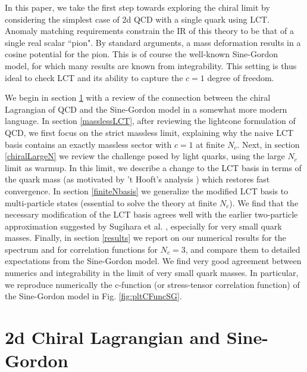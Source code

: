 \documentclass[12pt]{article}
\begin{document}
In this paper, we take the first step towards exploring the chiral limit by considering the simplest case of 2d QCD with a single quark using LCT.  Anomaly matching requirements constrain the IR of this theory to be that of a single real scalar ``pion".  By standard arguments, a mass deformation results in a cosine potential for the pion.  This is of course the well-known Sine-Gordon model, for which many results are known from integrability.  This setting is thus ideal to check LCT and its ability to capture the $c=1$ degree of freedom.
 
We begin in section \ref{sec_SG} with a review of the connection between the chiral Lagrangian of QCD and the Sine-Gordon model in a somewhat more modern language.
In section \ref{masslessLCT}, after reviewing the lightcone formulation of QCD, we first focus on the strict massless limit, explaining why the naive LCT basis contains an exactly massless sector with $c=1$ at finite $N_c$.  Next, in section \ref{chiralLargeN} we review the challenge posed by light quarks, using the large $N_c$ limit as warmup.  In this limit, we describe a change to the LCT basis in terms of the quark mass (as motivated by 't Hooft's analysis \cite{t1993two}) which restores fast convergence.  In section \ref{finiteNbasis} we generalize the modified LCT basis to multi-particle states (essential to solve the theory at finite $N_c$).  We find that the necessary modification of the LCT basis agrees well with the earlier two-particle approximation suggested by Sugihara et al. \cite{Sugihara}, especially for very small quark masses.  Finally, in section \ref{results} we report on our numerical results for the spectrum and for correlation functions for $N_c=3$, and compare them to detailed expectations from the Sine-Gordon model.  We find very good agreement between numerics and integrability in the limit of very small quark masses.  In particular, we reproduce numerically the c-function (or stress-tensor correlation function) of the Sine-Gordon model in Fig. \ref{fig:pltCFuncSG}.
 
 \section{2d Chiral Lagrangian and Sine-Gordon}
 \label{sec_SG}
 
\end{document}
